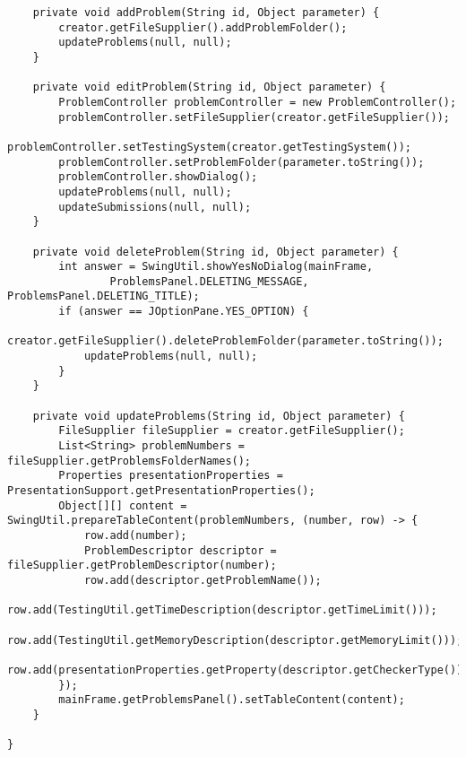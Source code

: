 \begin{verbatim}
    private void addProblem(String id, Object parameter) {
        creator.getFileSupplier().addProblemFolder();
        updateProblems(null, null);
    }
    
    private void editProblem(String id, Object parameter) {
        ProblemController problemController = new ProblemController();
        problemController.setFileSupplier(creator.getFileSupplier());
        problemController.setTestingSystem(creator.getTestingSystem());
        problemController.setProblemFolder(parameter.toString());
        problemController.showDialog();
        updateProblems(null, null);
        updateSubmissions(null, null);
    }
    
    private void deleteProblem(String id, Object parameter) {
        int answer = SwingUtil.showYesNoDialog(mainFrame,
                ProblemsPanel.DELETING_MESSAGE, ProblemsPanel.DELETING_TITLE);
        if (answer == JOptionPane.YES_OPTION) {
            creator.getFileSupplier().deleteProblemFolder(parameter.toString());
            updateProblems(null, null);
        }
    }
    
    private void updateProblems(String id, Object parameter) {
        FileSupplier fileSupplier = creator.getFileSupplier();
        List<String> problemNumbers = fileSupplier.getProblemsFolderNames();
        Properties presentationProperties = PresentationSupport.getPresentationProperties();
        Object[][] content = SwingUtil.prepareTableContent(problemNumbers, (number, row) -> {
            row.add(number);
            ProblemDescriptor descriptor = fileSupplier.getProblemDescriptor(number);
            row.add(descriptor.getProblemName());
            row.add(TestingUtil.getTimeDescription(descriptor.getTimeLimit()));
            row.add(TestingUtil.getMemoryDescription(descriptor.getMemoryLimit()));
            row.add(presentationProperties.getProperty(descriptor.getCheckerType()));
        });
        mainFrame.getProblemsPanel().setTableContent(content);
    }

}
\end{verbatim}

